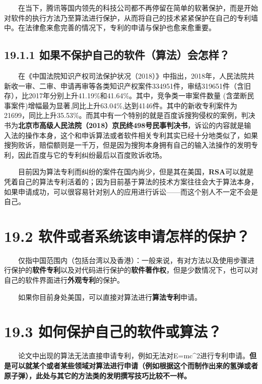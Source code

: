   在当下，腾讯等国内领先的科技公司都不再停留在简单的软著保护，而是开始对软件的执行方法乃至算法进行保护，从而将自己的技术紧紧保护在自己的专利墙中。在法律愈来愈完善的情况下，专利的申请与保护也愈来愈重要。

\subsection{19.1.1
如果不保护自己的软件（算法）会怎样？}\label{ux5982ux679cux4e0dux4fddux62a4ux81eaux5df1ux7684ux8f6fux4ef6ux7b97ux6cd5ux4f1aux600eux6837}

  在《中国法院知识产权司法保护状况（2018）》中指出，2018年，人民法院共新收一审、二审、申请再审等各类知识产权案件334951件，审结319651件（含旧存），比2017年分别上升41.19\%和41.64\%。其中，竞争类一审案件数量
(含垄断民事案件)增幅最为显著,同比上升63.04\%,达到4146件。其中的新收专利案件为21699，同比上升35.53\%。而其中有一个特别的就是百度诉搜狗侵权的案例，判决书为\textbf{北京市高级人民法院（2018）京民终498号民事判决书}，诉讼的内容就是输入法的操作本身，这个和申诉算法或者软件相关专利其实已经十分地类似了，如果搜狗败诉，赔偿额则是一千万，但是因为搜狗本身拥有自己的输入法操作的发明专利，因此百度与它的专利纠纷最后以百度败诉收场。

  目前因为算法专利而纠纷的案件在国内尚少，但是其在美国，\textbf{RSA}可以就是凭着自己的算法专利活着的；因为目前基于算法的技术方案往往会大于算法本身，如果申请成功，可以很容易针对别人的应用进行诉讼------而这个别人不一定不会是自己。

\section{19.2
软件或者系统该申请怎样的保护？}\label{ux8f6fux4ef6ux6216ux8005ux7cfbux7edfux8be5ux7533ux8bf7ux600eux6837ux7684ux4fddux62a4}

  仅指中国范围内（包括台湾以及香港）：一般来说，有对方法以及使用步骤进行保护的\textbf{软件专利}以及对代码进行保护的\textbf{软件著作权}，但是少数情况下，也可以对自己的软件界面进行\textbf{外观专利}的保护。

  如果你目前身处美国，可以直接对算法进行\textbf{算法专利}申请。

\section{19.3
如何保护自己的软件或算法？}\label{ux5982ux4f55ux4fddux62a4ux81eaux5df1ux7684ux8f6fux4ef6ux6216ux7b97ux6cd5}

  论文中出现的算法无法直接申请专利，例如无法对E=mc\^{}2进行专利申请。\textbf{但是可以就某个或者某些领域对算法进行申请（例如根据这个而制作出来的氢弹或者原子弹），此处与其它的方法类的发明撰写技巧比较不一样。}

